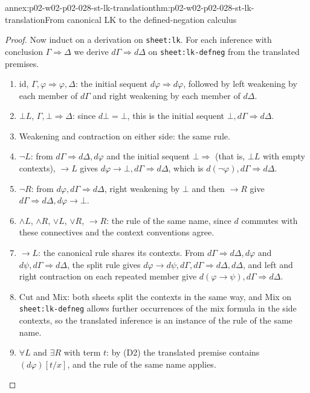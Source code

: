 \begin{annexitem}{annex:p02-w02-p02-028-st-lk-translation}{thm:p02-w02-p02-028-st-lk-translation}{From canonical LK to the defined-negation calculus}
\begin{proof}
Now induct on a derivation on \texttt{sheet:lk}.  For each inference with
conclusion \(\Gamma\Rightarrow\Delta\) we derive
\(d\Gamma\Rightarrow d\Delta\) on \texttt{sheet:lk-defneg} from the
translated premises.
\begin{enumerate}
  \item \(\mathrm{id}\), \(\Gamma,\varphi\Rightarrow\varphi,\Delta\): the
        initial sequent \(d\varphi\Rightarrow d\varphi\), followed by left
        weakening by each member of \(d\Gamma\) and right weakening by each
        member of \(d\Delta\).
  \item \(\bot L\), \(\Gamma,\bot\Rightarrow\Delta\): since \(d\bot=\bot\),
        this is the initial sequent \(\bot,d\Gamma\Rightarrow d\Delta\).
  \item Weakening and contraction on either side: the same rule.
  \item \(\neg L\): from \(d\Gamma\Rightarrow d\Delta,d\varphi\) and the
        initial sequent \(\bot\Rightarrow\) (that is, \(\bot L\) with empty
        contexts), \(\to L\) gives
        \(d\varphi\to\bot,d\Gamma\Rightarrow d\Delta\), which is
        \(d(\neg\varphi),d\Gamma\Rightarrow d\Delta\).
  \item \(\neg R\): from \(d\varphi,d\Gamma\Rightarrow d\Delta\), right
        weakening by \(\bot\) and then \(\to R\) give
        \(d\Gamma\Rightarrow d\Delta,d\varphi\to\bot\).
  \item \(\land L\), \(\land R\), \(\lor L\), \(\lor R\), \(\to R\): the rule
        of the same name, since \(d\) commutes with these connectives and the
        context conventions agree.
  \item \(\to L\): the canonical rule shares its contexts.  From
        \(d\Gamma\Rightarrow d\Delta,d\varphi\) and
        \(d\psi,d\Gamma\Rightarrow d\Delta\), the split rule gives
        \(d\varphi\to d\psi,d\Gamma,d\Gamma\Rightarrow d\Delta,d\Delta\), and
        left and right contraction on each repeated member give
        \(d(\varphi\to\psi),d\Gamma\Rightarrow d\Delta\).
  \item Cut and Mix: both sheets split the contexts in the same way, and
        Mix on \texttt{sheet:lk-defneg} allows further occurrences of the mix
        formula in the side contexts, so the translated inference is an
        instance of the rule of the same name.
  \item \(\forall L\) and \(\exists R\) with term \(t\): by (D2) the
        translated premise contains \((d\varphi)[t/x]\), and the rule of the
        same name applies.

\end{enumerate}
\end{proof}
\end{annexitem}
